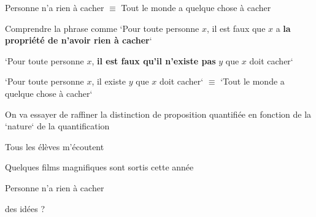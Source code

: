 \begin{frame}
	
		\begin{description}[labelindent=6pt,style=multiline,leftmargin=1.3in]
		 \setlength\itemsep{1em}
\item[Exemple] Personne n'a rien à cacher \pause $\equiv$ Tout le monde a quelque chose à cacher\pause
\item[Intuition] Comprendre la phrase comme `Pour toute personne $x$, il est faux que $x$ a \textbf{la propriété de n'avoir rien à cacher}`\pause
\item[$\equiv$]  `Pour toute personne $x$, \textbf{il est faux qu'il n'existe pas} $y$ que $x$ doit cacher`\pause
\item[$\equiv$] `Pour toute personne $x$, il existe $y$ que $x$ doit cacher` \pause $\equiv$ `Tout le monde a quelque chose à cacher`

	\end{description}
\end{frame}

\begin{frame}
	
		\begin{description}[labelindent=6pt,style=multiline,leftmargin=1.3in]
		 \setlength\itemsep{1em}
\item[Idée] On va essayer de raffiner la distinction de proposition quantifiée \pause en fonction de la `nature` de la quantification\pause
\item[Rappel des exemples] Tous les élèves m'écoutent 
\item[] Quelques films magnifiques sont sortis cette année
\item[] Personne n'a rien à cacher\pause
\item[Du coup] des idées ?
	\end{description}
\end{frame}



